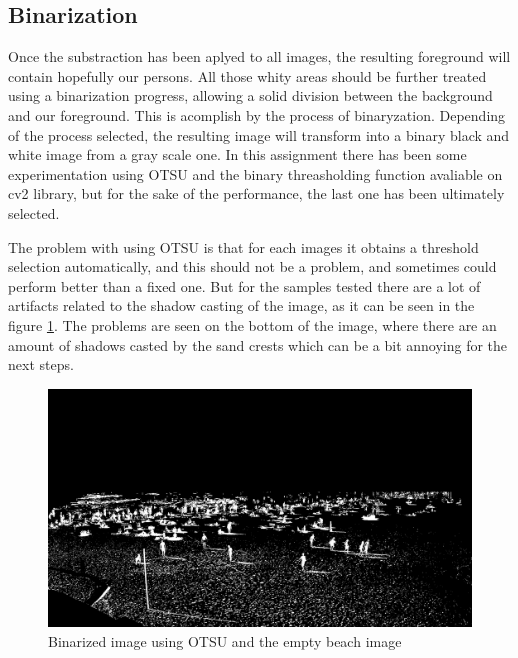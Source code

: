 \documentclass[10pt]{article}
\begin{document}
\subsection{Binarization}
Once the substraction has been aplyed to all images, the resulting foreground will contain hopefully our persons. All those whity areas should be further treated using a binarization progress, allowing a solid division between  the background and our foreground. This is acomplish by the process of binaryzation. Depending of the process selected, the resulting image will transform into a binary black and white image from a gray scale one. In this assignment there has been some experimentation using OTSU and the binary threasholding function avaliable on cv2 library, but for the sake of the performance, the last one has been ultimately selected.\newline

The problem with using OTSU is that for each images it obtains a threshold selection automatically, and this should not be a problem, and sometimes could perform better than a fixed one. But for the samples tested there are a lot of artifacts related to the shadow casting of the image, as it can be seen in the figure \ref{fig:otsu_bin}. The problems are seen on the bottom of the image, where there are an amount of shadows casted by the sand crests which can be a bit annoying for the next steps.\newline



\begin{figure}[htb]
    \centering
    \includegraphics[width=\textwidth]{img/OTSU_sub_arena.jpg}
    \caption{Binarized image using OTSU and the empty beach image}
    \label{fig:otsu_bin}
\end{figure}
\end{document}
